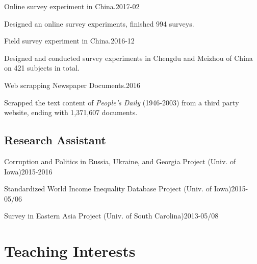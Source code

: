 \documentclass[10.5pt,]{article}
\providecommand{\tightlist}{%
	\setlength{\itemsep}{0pt}\setlength{\parskip}{0pt}}
\renewenvironment{itemize}{
	\begin{list}{}{
			\setlength{\leftmargin}{1.5em}
		}
	}{
	\end{list}
}
\begin{document}
\begin{itemize}
\tightlist
\item
  Online survey experiment in China.\hfill 2017-02

  \begin{itemize}
  \tightlist
  \item
    \footnotesize Designed an online survey experiments, finished 994
    surveys.
  \end{itemize}
\item
  Field survey experiment in China.\hfill 2016-12

  \begin{itemize}
  \tightlist
  \item
    \footnotesize Designed and conducted survey experiments in Chengdu
    and Meizhou of China on 421 subjects in total.
  \end{itemize}
\item
  Web scrapping Newspaper Documents.\hfill 2016

  \begin{itemize}
  \tightlist
  \item
    \footnotesize Scrapped the text content of \emph{People's Daily}
    (1946-2003) from a third party website, ending with 1,371,607
    documents.
  \end{itemize}
\end{itemize}

\subsection{Research Assistant}\label{research-assistant}

\begin{itemize}
\tightlist
\item
  Corruption and Politics in Russia, Ukraine, and Georgia Project (Univ.
  of Iowa)\hfill 2015-2016
\item
  Standardized World Income Inequality Database Project (Univ. of
  Iowa)\hfill 2015-05/06
\item
  Survey in Eastern Asia Project (Univ. of South
  Carolina)\hfill 2013-05/08
\end{itemize}

\section{Teaching Interests}\label{teaching-interests}
\end{document}

